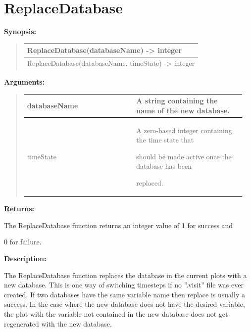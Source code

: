 \documentclass[letterpaper,10pt,english]{sphinxmanual}
\begin{document}
\section{ReplaceDatabase}
\label{functions:replacedatabase}
\begin{DUlineblock}{0em}
\item[] \textbf{Synopsis:}
\end{DUlineblock}
\begin{quote}

\begin{tabulary}{\linewidth}{|L|}
\hline

ReplaceDatabase(databaseName) -\textgreater{} integer
\\
\hline
ReplaceDatabase(databaseName, timeState) -\textgreater{} integer
\\
\hline\end{tabulary}

\end{quote}

\begin{DUlineblock}{0em}
\item[] 
\item[] \textbf{Arguments:}
\end{DUlineblock}
\begin{quote}

\begin{tabular}{|p{0.475\linewidth}|p{0.475\linewidth}|}
\hline

databaseName
 & 
A string containing the name of the new database.
\\
\hline
timeState
 & 
\begin{DUlineblock}{0em}
\item[] A zero-based integer containing the time state that
\item[] should be made active once the database has been
\item[] replaced.
\end{DUlineblock}
\\
\hline\end{tabular}

\end{quote}

\begin{DUlineblock}{0em}
\item[] 
\item[] \textbf{Returns:}
\item[] The ReplaceDatabase function returns an integer value of 1 for success and
\item[] 0 for failure.
\item[] 
\item[] \textbf{Description:}
\item[] The ReplaceDatabase function replaces the database in the current plots
with a new database. This is one way of switching timesteps if no
''.visit'' file was ever created. If two databases have the same variable
name then replace is usually a success. In the case where the new database
does not have the desired variable, the plot with the variable not
contained in the new database does not get regenerated with the new
database.
\end{DUlineblock}
\end{document}

